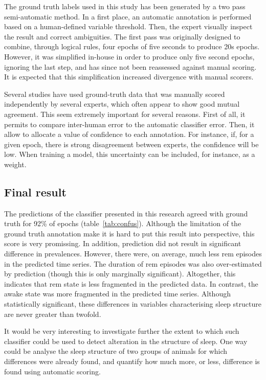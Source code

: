 The ground truth labels used in this study has been generated by a two pass semi-automatic method.
In a first place, an automatic annotation is performed based on a human-defined variable threshold.
Then, the expert visually inspect the result and correct ambiguities.
The first pass was originally designed to combine, through logical rules, four epochs of five seconds to produce 20s epochs\citationneeded{}.
However, it was simplified in-house in order to produce
only five second epochs, ignoring the last step, and has since not been reassessed against manual scoring.
It is expected that this simplification increased divergence with manual scorers.

Several studies have used ground-truth data that was manually scored independently by several experts,
which often appear to show good mutual agreement.
This seem extremely important for several reasons.
First of all, it permits to compare inter-human error to the automatic classifier error.
Then, it allow to allocate a value of confidence to each annotation.
For instance, if, for a given epoch, there is strong disagreement between experts, the confidence will be low.
When training a model, this uncertainty can be included, for instance, as a weight.

\subsection{Final result}
The predictions of the classifier presented in this research agreed with ground truth for 92\% of epochs (table~\ref{tab:confus}).
Although the limitation of the ground truth annotation make it is hard to put this result into perspective,
this score is very promissing.
In addition, prediction did not result in significant difference in prevalences.
However, there were, on average, much less \gls{rem} episodes in the predicted time series.
The duration of \gls{rem} episodes was also over-estimated by prediction (though this is only marginally significant).
Altogether, this indicates that \gls{rem} state is less fragmented in the predicted data.
In contrast, the awake state was more fragmented in the predicted time series.
Although statistically significant, these differences in variables characterising sleep structure are never greater than twofold.

It would be very interesting to investigate further the extent to which such classifier could be used to detect alteration
in the structure of sleep.
One way could be analyse the sleep structure of two groups of animals for which differences were already found, and quantify how much more, or less,
difference is found using automatic scoring.


